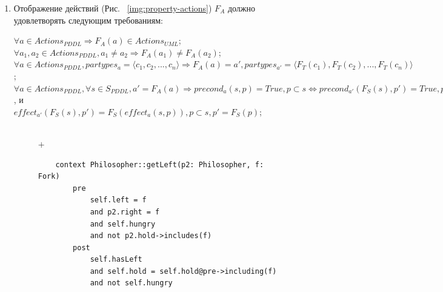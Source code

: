 \documentclass[a4paper,14pt]{extreport}
\begin{document}
\begin{enumerate}
        \item
    Отображение действий (Рис.
~\ref{img:property-actions}) $F_A$ должно удовлетворять следующим требованиям:
    \begin{center}
        $\forall a \in Actions_{PDDL} \Rightarrow F_A(a) \in Actions_{UML}$; \\    
    
        $\forall a_1, a_2 \in Actions_{PDDL}, a_1 \neq a_2 \Rightarrow F_A(a_1) \neq F_A(a_2)$; \\        
 
        $\forall a \in Actions_{PDDL}, partypes_a = \langle c_1, c_2, ..., c_n \rangle \Rightarrow F_A(a) = a', partypes_{a'} = \langle F_T(c_1), F_T(c_2), ..., F_T(c_n)\rangle$; \\
 
        $\forall a \in Actions_{PDDL}, \forall s \in S_{PDDL}, a' = F_A(a) \Rightarrow precond_a(s, p) = True, p \subset s \Leftrightarrow precond_{a'}(F_S(s), p') = True, p' = F_S(p)$, и \\
        
        $effect_{a'}(F_S(s), p') = F_S(effect_a(s, p)), p \subset s, p' = F_S(p) $;
    \end{center}            
       
\begin{figure}[h]
    \begin{minipage}[h]{1\linewidth}
    \end{minipage} \\
    \vfill
    {\centering $+$ \\ \medskip } 
        \begin{minipage}[h]{0.43\linewidth}
        
           \begin{verbatim}
    context Philosopher::getLeft(p2: Philosopher, f: Fork)
        pre 
            self.left = f 
            and p2.right = f 
            and self.hungry 
            and not p2.hold->includes(f)
        post
            self.hasLeft
            and self.hold = self.hold@pre->including(f)
            and not self.hungry
           \end{verbatim}
        \end{minipage}


\end{figure}
\end{enumerate}
\end{document}
